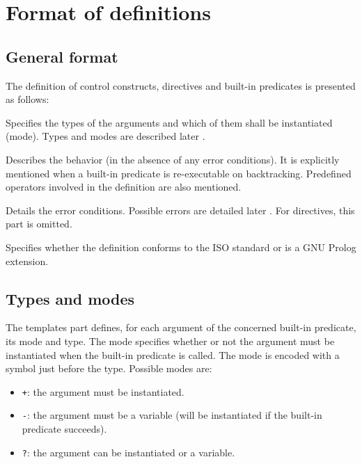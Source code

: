 \newpage
\section{Format of definitions}
\subsection{General format}
The definition of control constructs, directives and built-in predicates is
presented as follows:

\Templates

Specifies the types of the arguments and which of them shall be instantiated
(mode). Types and modes are described later .

\Description

Describes the behavior (in the absence of any error conditions). It is
explicitly mentioned when a built-in predicate is re-executable on
backtracking. Predefined operators involved in the definition are also
mentioned.

\Errors

Details the error conditions. Possible errors are detailed later
.  For directives, this part is omitted.

\Portability

Specifies whether the definition conforms to the ISO standard or is a GNU Prolog
extension.

\subsection{Types and modes}
\label{Types-and-modes}
The templates part defines, for each argument of the concerned built-in
predicate, its mode and type. The mode specifies whether or not the argument
must be instantiated when the built-in predicate is called. The mode is
encoded with a symbol just before the type. Possible modes are:

\begin{itemize}

\item \texttt{+}: the argument must be instantiated.

\item \texttt{-}: the argument must be a variable (will be instantiated if
the built-in predicate succeeds).

\item \texttt{?}: the argument can be instantiated or a variable.

\end{itemize}

